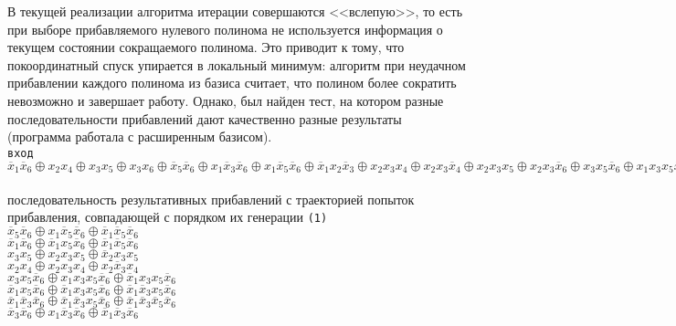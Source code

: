 \documentclass[a4paper,12pt,titlepage,finall]{article}
\begin{document}
В текущей реализации алгоритма итерации совершаются <<вслепую>>, то есть при выборе прибавляемого нулевого полинома не используется информация о текущем состоянии сокращаемого полинома. Это приводит к тому, что покоординатный спуск упирается в локальный минимум: алгоритм при неудачном прибавлении каждого полинома из базиса считает, что полином более сократить невозможно и завершает работу. Однако, был найден тест, на котором разные последовательности прибавлений дают качественно разные результаты (программа работала с расширенным базисом).
~\\
\texttt{вход}\\
$ \overline x_1 \overline x_6 \oplus x_2 x_4 \oplus x_3 x_5 \oplus x_3 x_6 \oplus \overline x_5 \overline x_6 \oplus x_1 \overline x_3 \overline x_6 \oplus x_1 \overline x_5 \overline x_6 \oplus \overline x_1 x_2 \overline x_3 \oplus x_2 x_3 x_4 \oplus x_2 x_3 \overline x_4 \oplus x_2 x_3 x_5 \oplus x_2 x_3 \overline x_6 \oplus x_3 x_5 \overline x_6 \oplus x_1 x_3 x_5 \overline x_6 \oplus \overline x_1 \overline x_3 \overline x_5 \overline x_6 \oplus x_2 x_3 x_4 x_5 \oplus x_2 \overline x_3 \overline x_5 \overline x_6 \oplus x_1 \overline x_2 x_3 \overline x_4 x_5 \overline x_6 $
~\\
последовательность результативных прибавлений с траекторией попыток прибавления, совпадающей с порядком их генерации \texttt{(1)}\\
$ \overline x_5 \overline x_6 \oplus x_1 \overline x_5 \overline x_6 \oplus \overline x_1 \overline x_5 \overline x_6 $ \\
$ \overline x_1 \overline x_6 \oplus \overline x_1 x_5 \overline x_6 \oplus \overline x_1 \overline x_5 \overline x_6 $ \\
$ x_3 x_5 \oplus x_2 x_3 x_5 \oplus \overline x_2 x_3 x_5 $ \\
$ x_2 x_4 \oplus x_2 x_3 x_4 \oplus x_2 \overline x_3 x_4 $ \\
$ x_3 x_5 \overline x_6 \oplus x_1 x_3 x_5 \overline x_6 \oplus \overline x_1 x_3 x_5 \overline x_6 $ \\
$ \overline x_1 x_5 \overline x_6 \oplus \overline x_1 x_3 x_5 \overline x_6 \oplus \overline x_1 \overline x_3 x_5 \overline x_6 $ \\
$ \overline x_1 \overline x_3 \overline x_6 \oplus \overline x_1 \overline x_3 x_5 \overline x_6 \oplus \overline x_1 \overline x_3 \overline x_5 \overline x_6 $ \\
$ \overline x_3 \overline x_6 \oplus x_1 \overline x_3 \overline x_6 \oplus \overline x_1 \overline x_3 \overline x_6 $ \\
\end{document}

